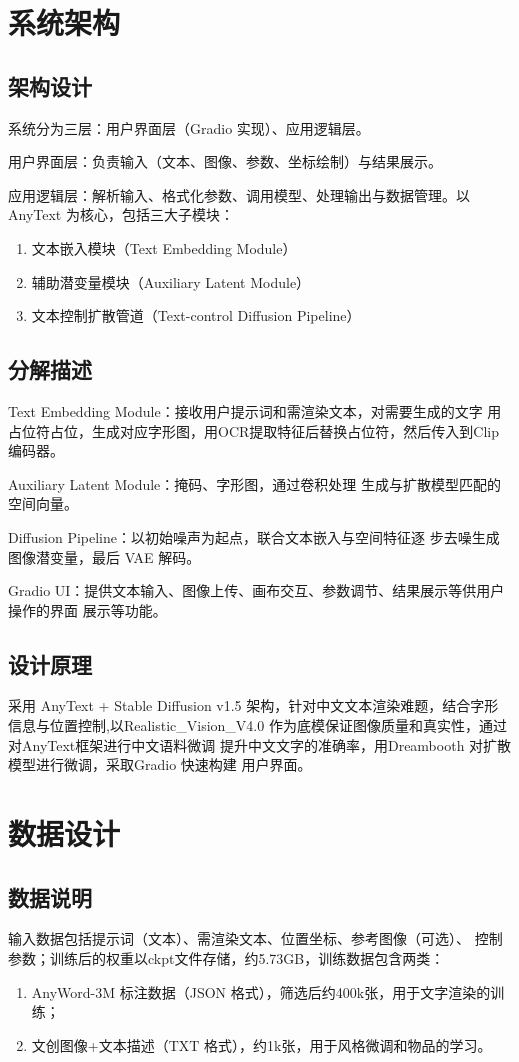 \documentclass[a4paper,12pt]{ctexart}  %
\begin{document}
\section{系统架构}
\subsection{架构设计}
系统分为三层：用户界面层（Gradio 实现）、应用逻辑层。

用户界面层：负责输入（文本、图像、参数、坐标绘制）与结果展示。

应用逻辑层：解析输入、格式化参数、调用模型、处理输出与数据管理。以 AnyText 为核心，包括三大子模块：

\begin{enumerate}
    \item 文本嵌入模块（Text Embedding Module）
    \item 辅助潜变量模块（Auxiliary Latent Module）
    \item 文本控制扩散管道（Text-control Diffusion Pipeline）
\end{enumerate}
\subsection{分解描述}
Text Embedding Module：接收用户提示词和需渲染文本，对需要生成的文字
用占位符占位，生成对应字形图，用OCR提取特征后替换占位符，然后传入到Clip编码器。

Auxiliary Latent Module：掩码、字形图，通过卷积处理
生成与扩散模型匹配的空间向量。

Diffusion Pipeline：以初始噪声为起点，联合文本嵌入与空间特征逐
步去噪生成图像潜变量，最后 VAE 解码。

Gradio UI：提供文本输入、图像上传、画布交互、参数调节、结果展示等供用户操作的界面
展示等功能。
\subsection{设计原理}
采用 AnyText + Stable Diffusion v1.5 架构，针对中文文本渲染难题，结合字形
信息与位置控制,以Realistic\_Vision\_V4.0 作为底模保证图像质量和真实性，通过对AnyText框架进行中文语料微调
提升中文文字的准确率，用Dreambooth 对扩散模型进行微调，采取Gradio 快速构建 用户界面。

\section{数据设计}
\subsection{数据说明}
输入数据包括提示词（文本）、需渲染文本、位置坐标、参考图像（可选）、
控制参数；训练后的权重以ckpt文件存储，约5.73GB，训练数据包含两类：
\begin{enumerate}
    \item AnyWord-3M 标注数据（JSON 格式），筛选后约400k张，用于文字渲染的训练；

    \item 文创图像+文本描述（TXT 格式），约1k张，用于风格微调和物品的学习。
\end{enumerate}
\end{document}
